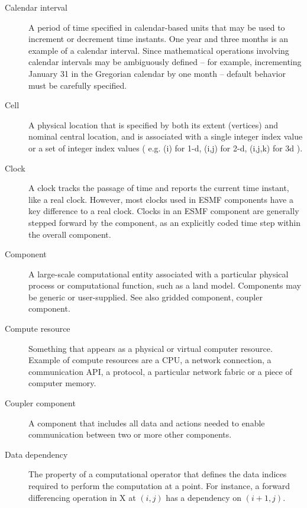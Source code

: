\begin{description}
\item[Calendar interval] \label{glos:CalInt} A period of time specified
in calendar-based units that may be used to increment or decrement time instants.  
One year and three months is an example of a calendar interval.  Since 
mathematical operations involving calendar intervals may be ambiguously 
defined -- for example, incrementing January 31 in the Gregorian calendar by 
one month -- default behavior must be carefully specified.  

\item[Cell] \label{glos:Cell} A physical location that is specified by both 
  its extent (vertices) and nominal central location, and is associated with 
  a single integer index value or a set of integer index values ( e.g.
  (i) for 1-d, (i,j) for 2-d, (i,j,k) for 3d ).

\item[Clock] \label{glos:Clock} A clock tracks the passage of time and 
reports the current time instant, like a real clock.  However, most clocks 
used in ESMF components have a key difference to a real clock. Clocks 
in an ESMF component are generally stepped forward by the component, as an 
explicitly coded time step within the overall component.

\item[Component] \label{glos:Component} A large-scale computational entity 
  associated with a particular physical process or computational function, 
  such as a land model.  Components may be generic or user-supplied.  
  See also gridded component, coupler component.

\item[Compute resource] \label{glos:CompResource} Something that appears as a
  physical or virtual computer resource. Example of compute resources
  are a CPU, a network connection, a communication API, a protocol, a 
  particular network fabric or a piece of computer memory. 

\item[Coupler component] \label{glos:Coupler}
  A component that includes all data and actions needed to enable 
  communication between two or more other components.

\item[Data dependency] \label{glos:DataDep} The property of a computational
  operator that defines the data indices required to perform
  the computation at a point.  For instance, a forward differencing
  operation in X at $(i,j)$ has a dependency on $(i+1,j)$.


\end{description}
